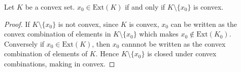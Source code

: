 
\begin{lemma}
  Let $K$ be a convex set. $x_0 \in \textrm{Ext}(K)$ if and only if
  $K \setminus \{ x_0 \}$ is convex.
  \label{lem:extreme_point_of_convex_set}
\end{lemma}
\begin{proof}
  If $K \setminus \{ x_0 \}$ is not convex, since $K$ is convex,
  $x_0$ can be written as the convex combination of elements in
  $K\setminus \{ x_0 \}$
  which makes $x_0 \notin \textrm{Ext}(K_0)$. Conversely if $x_0 \in
  \textrm{Ext}(K)$, then
  $x_0$ cannnot be written as the convex combination of elements of
  $K$. Hence $K \setminus \{ x_0 \}$
  is closed under convex combinations, making in convex.
\end{proof}

